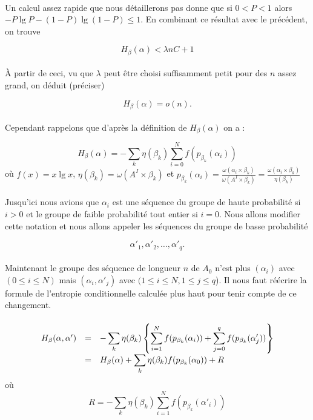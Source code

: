 	\paragraph{}
	Un calcul assez rapide que nous détaillerons pas donne que si $0<P<1$ alors $-P\lg P -(1-P)\lg(1-P)\le 1$. En combinant ce résultat avec le précédent, on trouve
	
	\[H_\beta(\alpha) < \lambda nC + 1\]
	
	\paragraph{}
	À partir de ceci, vu que $\lambda$ peut être choisi suffisamment petit pour des $n$ assez grand, on déduit (préciser)
	
	\[H_\beta(\alpha)=o(n).\]
	
	\paragraph{}
	Cependant rappelons que d'après la définition de $H_\beta(\alpha)$ on a :
	
	\[H_\beta(\alpha) = - \sum_k\eta(\beta_k)\sum_{i=0}^Nf(p_{\beta_k}(\alpha_i))\]
	où $f(x) = x \lg x$, $\eta(\beta_k) = \omega(A^I \times \beta_k)$ 
	et $p_{\beta_k}(\alpha_i) = \frac{\omega(\alpha_i \times \beta_k)}{\omega(A^I \times \beta_k)}=\frac{\omega(\alpha_i \times \beta_k)}{\eta(\beta_k)}$	
	
	\paragraph{}
	Jusqu'ici nous avions que $\alpha_i$ est une séquence du groupe de haute probabilité si $i>0$ et le groupe de faible probabilité tout entier si $i=0$.
	Nous allons modifier cette notation et nous allons appeler les séquences du groupe de basse probabilité 
	
	\[\alpha'_1, \alpha'_2, \dots, \alpha'_q.\]
	
	\paragraph{}
	Maintenant le groupe des séquence de longueur $n$ de $A_0$ n'est plus $(\alpha_i)$ avec $(0 \le i \le N)$ mais $(\alpha_i, \alpha'_j)$ avec $(1\le i \le N, 1 \le j \le q$).
	Il nous faut réécrire la formule de l'entropie conditionnelle calculée plus haut pour tenir compte de ce changement.
	
	\paragraph{}
	\[
		\begin{array}{r c >{\displaystyle}l}
			H_\beta(\alpha,\alpha') &=& - \sum_k\eta(\beta_k)\left\{\sum_{i=1}^Nf(p_{\beta_k}(\alpha_i))+\sum_{j=0}^qf(p_{\beta_k}(\alpha'_j))\right\}\\
			&=& H_\beta(\alpha) + \sum_k\eta(\beta_k)f(p_{\beta_k}(\alpha_0))+R
		\end{array}
	\]
	où
	\[R=- \sum_k\eta(\beta_k)\sum_{i=1}^Nf(p_{\beta_k}(\alpha'_i))\]
	
